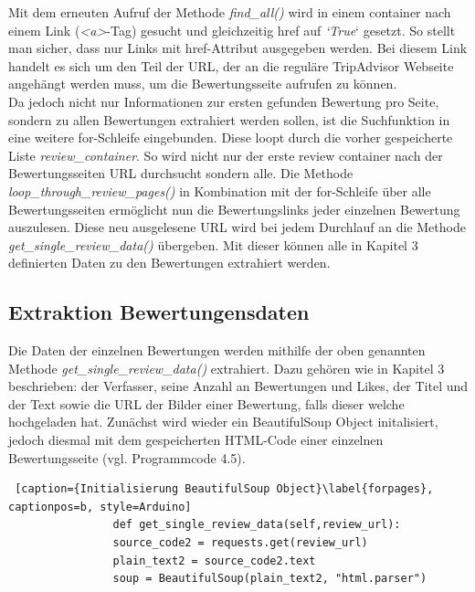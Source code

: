 \documentclass[a4paper,oneside,12pt]{report}
\begin{document}
				Mit dem erneuten Aufruf der Methode \textit{find\_all()} wird in einem container nach einem Link (\textit{<a>}-Tag) gesucht und gleichzeitig href auf \textit{‘True}‘ gesetzt. So stellt man sicher, dass nur Links mit href-Attribut ausgegeben werden. Bei diesem Link handelt es sich um den Teil der URL, der an die reguläre TripAdvisor Webseite angehängt werden muss, um die Bewertungsseite aufrufen zu können.
				\\
				Da jedoch nicht nur Informationen zur ersten gefunden Bewertung pro Seite, sondern zu allen Bewertungen extrahiert werden sollen, ist die Suchfunktion in eine weitere for-Schleife eingebunden. Diese loopt durch die vorher gespeicherte Liste \textit{review\_container}. So wird nicht nur der erste review container nach der Bewertungsseiten URL durchsucht sondern alle. Die Methode \textit{loop\_through\_review\_pages()} in Kombination mit der for-Schleife über alle Bewertungsseiten ermöglicht nun die Bewertungslinks jeder einzelnen Bewertung auszulesen.
				\newline
				Diese neu ausgelesene URL wird bei jedem Durchlauf an die Methode \textit{get\_single\_review\_data()} übergeben. Mit dieser können alle in Kapitel 3 definierten Daten zu den Bewertungen extrahiert werden.
	
	
	
			\subsection[Extraktion Bewertungensdaten - Johanna Sickendiek]{Extraktion Bewertungensdaten}
			
				Die Daten der einzelnen Bewertungen werden mithilfe der oben genannten Methode 
				\textit{get\_single\_review\_data()} extrahiert. Dazu gehören wie in Kapitel 3 beschrieben: der Verfasser, seine Anzahl an Bewertungen und Likes, der Titel und der Text sowie die URL der Bilder einer Bewertung, falls dieser welche hochgeladen hat. 
				Zunächst wird wieder ein BeautifulSoup Object initalisiert, jedoch diesmal mit dem gespeicherten HTML-Code einer einzelnen Bewertungsseite (vgl. Programmcode 4.5).
				\\
				\begin{lstlisting} [caption={Initialisierung BeautifulSoup Object}\label{forpages}, captionpos=b, style=Arduino]
				def get_single_review_data(self,review_url):     
				source_code2 = requests.get(review_url)
				plain_text2 = source_code2.text
				soup = BeautifulSoup(plain_text2, "html.parser")
				\end{lstlisting}
				
\end{document}
